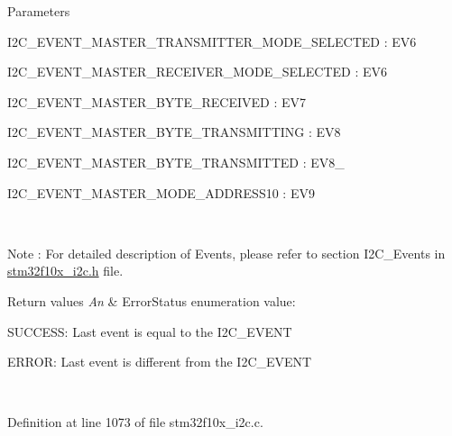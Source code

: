 \begin{DoxyParams}{Parameters}
\begin{DoxyItemize}
I2\+C\+\_\+\+E\+V\+E\+N\+T\+\_\+\+M\+A\+S\+T\+E\+R\+\_\+\+T\+R\+A\+N\+S\+M\+I\+T\+T\+E\+R\+\_\+\+M\+O\+D\+E\+\_\+\+S\+E\+L\+E\+C\+T\+ED \+: E\+V6 \item I2\+C\+\_\+\+E\+V\+E\+N\+T\+\_\+\+M\+A\+S\+T\+E\+R\+\_\+\+R\+E\+C\+E\+I\+V\+E\+R\+\_\+\+M\+O\+D\+E\+\_\+\+S\+E\+L\+E\+C\+T\+ED \+: E\+V6 \item I2\+C\+\_\+\+E\+V\+E\+N\+T\+\_\+\+M\+A\+S\+T\+E\+R\+\_\+\+B\+Y\+T\+E\+\_\+\+R\+E\+C\+E\+I\+V\+ED \+: E\+V7 \item I2\+C\+\_\+\+E\+V\+E\+N\+T\+\_\+\+M\+A\+S\+T\+E\+R\+\_\+\+B\+Y\+T\+E\+\_\+\+T\+R\+A\+N\+S\+M\+I\+T\+T\+I\+NG \+: E\+V8 \item I2\+C\+\_\+\+E\+V\+E\+N\+T\+\_\+\+M\+A\+S\+T\+E\+R\+\_\+\+B\+Y\+T\+E\+\_\+\+T\+R\+A\+N\+S\+M\+I\+T\+T\+ED \+: E\+V8\+\_ \item I2\+C\+\_\+\+E\+V\+E\+N\+T\+\_\+\+M\+A\+S\+T\+E\+R\+\_\+\+M\+O\+D\+E\+\_\+\+A\+D\+D\+R\+E\+S\+S10 \+: E\+V9\end{DoxyItemize}
\\
\hline
\end{DoxyParams}
\begin{DoxyNote}{Note}
\+: For detailed description of Events, please refer to section I2\+C\+\_\+\+Events in \hyperlink{stm32f10x__i2c_8h}{stm32f10x\+\_\+i2c.\+h} file.
\end{DoxyNote}

\begin{DoxyRetVals}{Return values}
{\em An} & Error\+Status enumeration value\+:
\begin{DoxyItemize}
\item S\+U\+C\+C\+E\+SS\+: Last event is equal to the I2\+C\+\_\+\+E\+V\+E\+NT
\item E\+R\+R\+OR\+: Last event is different from the I2\+C\+\_\+\+E\+V\+E\+NT 
\end{DoxyItemize}\\
\hline
\end{DoxyRetVals}


Definition at line 1073 of file stm32f10x\+\_\+i2c.\+c.

\mbox{\label{group___i2_c___private___functions_ga9d4f8fe9f7232696114b5578b1223963}} 
